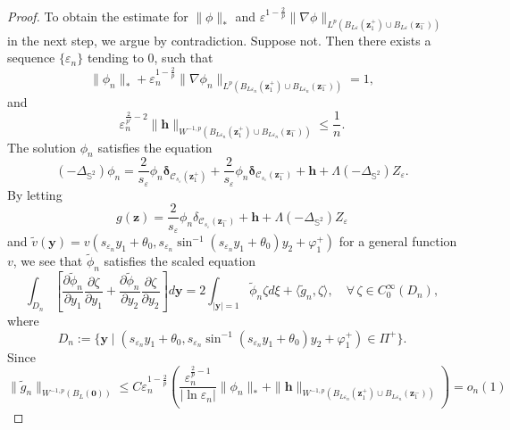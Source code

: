 \documentclass[12pt,reqno]{amsart}
\numberwithin{equation}{section}
\theoremstyle{definition}
\theoremstyle{remark}
\begin{document}
\begin{proof}
	To obtain the estimate for $\|\phi\|_*$ and $\varepsilon^{1-\frac{2}{p}}\|\nabla\phi\|_{L^p(B_{L\varepsilon}(\boldsymbol z_1^+)\cup B_{L\varepsilon}(\boldsymbol z_1^-))}$ in the next step, we argue by contradiction. Suppose not. Then there exists a sequence $\{\varepsilon_n\}$ tending to $0$, such that
	\begin{equation}\label{2-10}
		\|\phi_n\|_*+\varepsilon_n^{1-\frac{2}{p}}\|\nabla\phi_n\|_{L^p(B_{L\varepsilon_n}(\boldsymbol z_1^+)\cup B_{L\varepsilon_n}(\boldsymbol z_1^-))}=1,
	\end{equation} 
	and
	\begin{equation*}
		\varepsilon_n^{\frac{2}{p'}-2} \|\mathbf h\|_{W^{-1,p}(B_{L\varepsilon_n}(\boldsymbol z_1^+)\cup B_{L\varepsilon_n}(\boldsymbol z_1^-))}\le\frac{1}{n}.
	\end{equation*}
	The solution $\phi_n$ satisfies the equation
	\begin{equation*}
		(-\Delta_{\mathbb S^2})\phi_n=\frac{2}{s_\varepsilon}\phi_n\boldsymbol \delta_{\mathcal C_{s_\varepsilon}(\boldsymbol z_1^+)}+\frac{2}{s_\varepsilon}\phi_n\boldsymbol \delta_{\mathcal C_{s_\varepsilon}(\boldsymbol z_1^-)}+\mathbf h+\Lambda(-\Delta_{\mathbb S^2})Z_\varepsilon.
	\end{equation*}
	By letting
	$$g(\boldsymbol z)=\frac{2}{s_\varepsilon}\phi_n\delta_{\mathcal C_{s_\varepsilon}(\boldsymbol z_1^-)}+\mathbf h+\Lambda(-\Delta_{\mathbb S^2})Z_\varepsilon$$
	and $\tilde v(\boldsymbol y)=v(s_{\varepsilon_n}y_1+\theta_0,s_{\varepsilon_n}\sin^{-1}(s_{\varepsilon_n}y_1+\theta_0)y_2+\varphi_1^+)$ for a general function $v$, we see that $\tilde\phi_n$ satisfies the scaled equation
	\begin{equation}\label{2-11}
		\int_{D_n}\left[\frac{\partial \tilde\phi_n}{\partial y_1}\frac{\partial \zeta}{\partial y_1}+\frac{\partial \tilde\phi_n}{\partial y_2}\frac{\partial \zeta}{\partial y_2}\right]d\boldsymbol y=2\int_{|\boldsymbol y|=1}\tilde\phi_n\zeta d\xi+\langle \tilde g_n, \zeta\rangle, \quad \forall \, \zeta\in C_0^\infty(D_n),
	\end{equation}
	where
	$$D_n:=\{\boldsymbol y\mid (s_{\varepsilon_n}y_1+\theta_0,s_{\varepsilon_n}\sin^{-1}(s_{\varepsilon_n}y_1+\theta_0)y_2+\varphi_1^+)\in \Pi^+\}.$$
	Since 
	\begin{equation*}
		\|\tilde g_n\|_{W^{-1,p}(B_L(\boldsymbol 0))}\le C\varepsilon_n^{1-\frac{2}{p}}\left( \frac{\varepsilon_n^{\frac{2}{p}-1}}{|\ln\varepsilon_n|}\|\phi_n\|_*+\|\mathbf h\|_{W^{-1,p}(B_{L\varepsilon_n}(\boldsymbol z_1^+)\cup B_{L\varepsilon_n}(\boldsymbol z_1^-))}\right)=o_n(1)

\end{equation*}
\end{proof}
\end{document}
